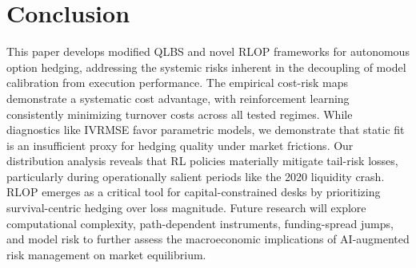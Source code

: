 \section{Conclusion}

This paper develops modified QLBS and novel RLOP frameworks for autonomous option hedging, addressing the systemic risks inherent in the decoupling of model calibration from execution performance. The empirical cost-risk maps demonstrate a systematic cost advantage, with reinforcement learning consistently minimizing turnover costs across all tested regimes. While diagnostics like IVRMSE favor parametric models, we demonstrate that static fit is an insufficient proxy for hedging quality under market frictions. Our distribution analysis reveals that RL policies materially mitigate tail-risk losses, particularly during operationally salient periods like the 2020 liquidity crash. RLOP emerges as a critical tool for capital-constrained desks by prioritizing survival-centric hedging over loss magnitude. Future research will explore computational complexity, path-dependent instruments, funding-spread jumps, and model risk to further assess the macroeconomic implications of AI-augmented risk management on market equilibrium.




